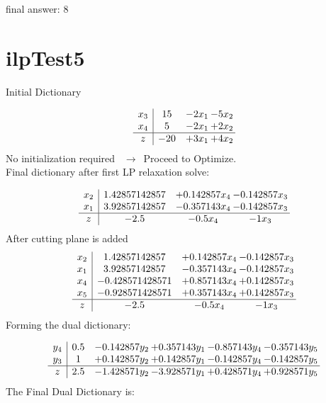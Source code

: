 \documentclass[11pt]{article}
\begin{document}
final answer: 8

\section{ilpTest5}

Initial Dictionary 

\[\begin{array}{c| c c@{\hskip 2pt} c@{\hskip 2pt} }
 x_{3}   &  15 & -2 x_{1} & -5 x_{2}\\
 x_{4}   &  5 & -2 x_{1} & + 2 x_{2}\\
\hline
z    &  -20 & + 3 x_{1} & + 4 x_{2}\\
\end{array}\]
No initialization required \ $\rightarrow$\  Proceed to Optimize. \\ 
Final dictionary after first LP relaxation solve: 

\[\begin{array}{c| c c@{\hskip 2pt} c@{\hskip 2pt} }
 x_{2}   &  1.42857142857 & + 0.142857 x_{4} & -0.142857 x_{3}\\
 x_{1}   &  3.92857142857 & -0.357143 x_{4} & -0.142857 x_{3}\\
\hline
z    &  -2.5 & -0.5 x_{4} & -1 x_{3}\\
\end{array}\]
 After cutting plane is added 
\[\begin{array}{c| c c@{\hskip 2pt} c@{\hskip 2pt} }
 x_{2}   &  1.42857142857 & + 0.142857 x_{4} & -0.142857 x_{3}\\
 x_{1}   &  3.92857142857 & -0.357143 x_{4} & -0.142857 x_{3}\\
 x_{4}   &  -0.428571428571 & + 0.857143 x_{4} & + 0.142857 x_{3}\\
 x_{5}   &  -0.928571428571 & + 0.357143 x_{4} & + 0.142857 x_{3}\\
\hline
z    &  -2.5 & -0.5 x_{4} & -1 x_{3}\\
\end{array}\]
Forming the dual dictionary:

\[\begin{array}{c| c c@{\hskip 2pt} c@{\hskip 2pt} c@{\hskip 2pt} c@{\hskip 2pt} }
 y_{4}   &  0.5 & -0.142857 y_{2} & + 0.357143 y_{1} & -0.857143 y_{4} & -0.357143 y_{5}\\
 y_{3}   &  1 & + 0.142857 y_{2} & + 0.142857 y_{1} & -0.142857 y_{4} & -0.142857 y_{5}\\
\hline
z    &  2.5 & -1.428571 y_{2} & -3.928571 y_{1} & + 0.428571 y_{4} & + 0.928571 y_{5}\\
\end{array}\]
The Final Dual Dictionary is: 
\end{document}
